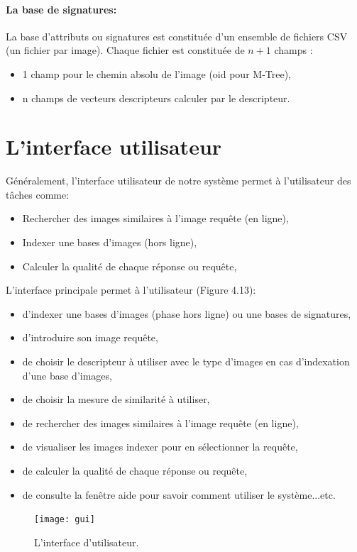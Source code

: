 \paragraph{La base de signatures:}
La base d’attributs ou signatures est constituée d’un ensemble de fichiers CSV (un fichier par image). Chaque fichier est constituée de $ n+1 $ champs :
\begin{itemize}
	\item 1 champ pour le chemin absolu de l'image (oid pour M-Tree),
	\item n champs de vecteurs descripteurs calculer par le descripteur.
\end{itemize}
\section{L’interface utilisateur }
Généralement, l'interface utilisateur de notre système permet à l'utilisateur des tâches comme:
 \begin{itemize}
 	\item Rechercher des images similaires à l'image requête (en ligne),
 	\item Indexer une bases d'images (hors ligne),
 	\item Calculer la qualité de chaque réponse ou requête,
 \end{itemize}

L'interface principale permet à l’utilisateur (Figure 4.13): 
\begin{itemize}
	\item d'indexer une bases d'images (phase hors ligne) ou une bases de signatures,
	\item d’introduire son image requête,
	\item de choisir le descripteur à utiliser avec le type d'images en cas d'indexation d'une base d'images,
	\item de choisir la mesure de similarité à utiliser,
	\item de rechercher des images similaires à l'image requête (en ligne),
	\item de visualiser les images indexer pour en sélectionner la requête,
	\item de calculer la qualité de chaque réponse ou requête,
	\item de consulte la fenêtre aide pour savoir comment utiliser le système...etc.
\end{itemize}

\begin{figure}[H]
	\centering
	\texttt{[image: gui]} 
	\caption{L'interface d’utilisateur.}
\end{figure}

